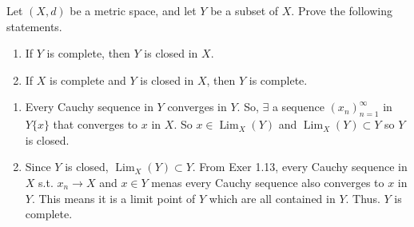\documentclass[12pt,letterpaper,boxed]{hmcpset}
\DeclareMathOperator{\Lim}{Lim}
\begin{document}
\begin{problem}[Exercise 2.18]
Let $(X, d)$ be a metric space, and let $Y$ be a subset of $X$. Prove the following statements. 
\vspace{-2mm}
	\begin{enumerate}
		\itemsep0em
		\item If $Y$ is complete, then $Y$ is closed in $X$.
		\item If $X$ is complete and $Y$ is closed in $X$, then $Y$ is complete.
	\end{enumerate}
\end{problem}

\begin{solution}
\vspace{-2mm}
	\begin{enumerate}
		\itemsep0em
		\item Every Cauchy sequence in $Y$ converges in $Y$. So, $\exists$ a sequence $(x_n)_{n=1}^{\infty}$ in $Y\{x\}$ that converges to $x$ in $X$. So $x \in \Lim_X(Y)$ and $\Lim_X(Y)\subset Y$ so $Y$ is closed.
		\item Since $Y$ is closed, $\Lim_X(Y)\subset Y$. From Exer 1.13, every Cauchy sequence in $X$ s.t. $x_n \rightarrow X$ and $x\in Y$ menas every Cauchy sequence also converges to $x$ in $Y$. This means it is a limit point of $Y$ which are all contained in $Y$. Thus. $Y$ is complete.
	\end{enumerate}
\end{solution}
\end{document}
